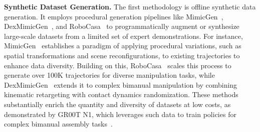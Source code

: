 \documentclass[10pt, a4paper, logo, copyright]{googledeepmind} %
\begin{document}
\textbf{Synthetic Dataset Generation.} The first methodology is offline synthetic data generation. It employs procedural generation pipelines like MimicGen~\cite{mandlekar2023mimicgen}, DexMimicGen~\cite{jiang2024dexmimicen}, and RoboCasa~\cite{nasiriany2024robocasa} to programmatically augment or synthesize large-scale datasets from a limited set of expert demonstrations. For instance, MimicGen~\cite{mandlekar2023mimicgen} establishes a paradigm of applying procedural variations, such as spatial transformations and scene reconfigurations, to existing trajectories to enhance data diversity. Building on this, RoboCasa~\cite{nasiriany2024robocasa} scales this process to generate over 100K trajectories for diverse manipulation tasks, while DexMimicGen~\cite{jiang2024dexmimicen} extends it to complex bimanual manipulation by combining kinematic retargeting with contact dynamics randomization. These methods substantially enrich the quantity and diversity of datasets at low costs, as demonstrated by GR00T N1, which leverages such data to train policies for complex bimanual assembly tasks~\cite{nvidia2025gr00tn1openfoundation}.
\end{document}
